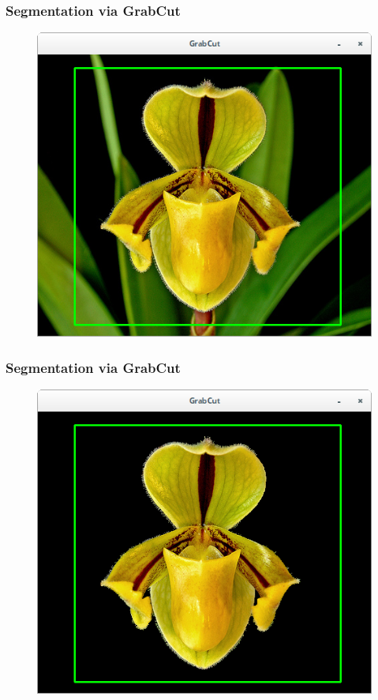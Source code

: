 \documentclass[]{beamer}
\begin{document}
    \begin{frame}[plain]
        \frametitle{Segmentation via GrabCut}

        \begin{figure}[h]
        \centering
        \includegraphics[width=.60\textwidth]{GrabCut_druryi_2}
        \end{figure}
    \end{frame}

    \begin{frame}[plain]
        \frametitle{Segmentation via GrabCut}

        \begin{figure}[h]
        \centering
        \includegraphics[width=.60\textwidth]{GrabCut_druryi_3}
        \end{figure}
    \end{frame}
\end{document}
